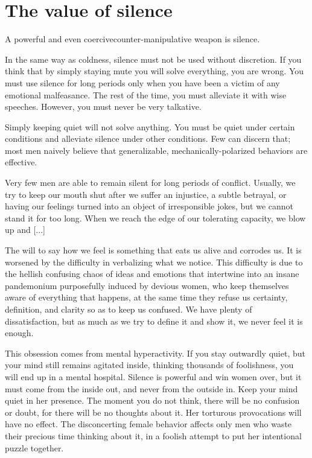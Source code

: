 \section{The value of silence}

\par A powerful and even coercive\footnotemark[19] counter-manipulative weapon is silence.


\par In the same way as coldness, silence must not be used without discretion. If you think that by simply staying mute you will solve everything, you are wrong. You must use silence for long periods only when you have been a victim of any emotional malfeasance. The rest of the time, you must alleviate it with wise speeches. However, you must never be very talkative.

\par Simply keeping quiet will not solve anything. You must be quiet under certain conditions and alleviate silence under other conditions. Few can discern that; most men naively believe that generalizable, mechanically-polarized behaviors are effective.

\par Very few men are able to remain silent for long periods of conflict. Usually, we try to keep our mouth shut after we suffer an injustice, a subtle betrayal, or having our feelings turned into an object of irresponsible jokes, but we cannot stand it for too long. When we reach the edge of our tolerating capacity, we blow up and [...]

\par The will to say how we feel is something that eats us alive and corrodes us. It is worsened by the difficulty in verbalizing what we notice. This difficulty is due to the hellish confusing chaos of ideas and emotions that intertwine into an insane pandemonium purposefully induced by devious women, who keep themselves aware of everything that happens, at the same time they refuse us certainty, definition, and clarity so as to keep us confused. We have plenty of dissatisfaction, but as much as we try to define it and show it, we never feel it is enough.

\par This obsession comes from mental hyperactivity. If you stay outwardly quiet, but your mind still remains agitated inside, thinking thousands of foolishness, you will end up in a mental hospital. Silence is powerful and win women over, but it must come from the inside out, and never from the outside in. Keep your mind quiet in her presence. The moment you do not think, there will be no confusion or doubt, for there will be no thoughts about it. Her torturous provocations will have no effect. The disconcerting female behavior affects only men who waste their precious time thinking about it, in a foolish attempt to put her intentional puzzle together.

